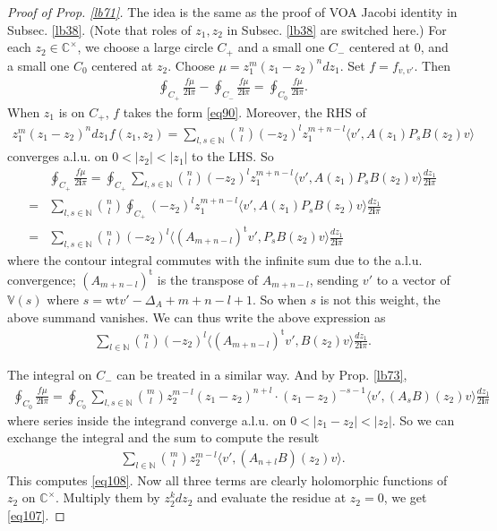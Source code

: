 \documentclass[12pt,a4paper,notitlepage]{article}
\theoremstyle{definition}
\theoremstyle{plain}
\newcommand{\tr}{\mathrm{t}} %
\newcommand{\bk}[1]{\langle {#1}\rangle}
\newcommand{\im}{\mathbf{i}}
\newcommand{\Vbb}{\mathbb V}
\newcommand{\Cbb}{\mathbb C}
\newcommand{\Nbb}{\mathbb N}
\newcommand{\wt}{\mathrm{wt}}
\numberwithin{equation}{section}
\begin{document}
\begin{proof}[Proof of Prop. \ref{lb71}]
The idea is the same as the proof of VOA Jacobi identity in Subsec. \ref{lb38}. (Note that roles of $z_1,z_2$ in Subsec. \ref{lb38} are switched here.) For each $z_2\in\Cbb^\times$, we choose a large circle $C_+$ and a small one $C_-$ centered at $0$, and a small one $C_0$ centered at $z_2$. Choose $\mu=z_1^m(z_1-z_2)^ndz_1$. Set $f=f_{v,v'}$. Then 
\begin{align}\label{eq108}
	\oint_{C_+}\frac{f\mu}{2\im\pi} -\oint_{C_-}\frac{f\mu}{2\im\pi}=\oint_{C_0} \frac{f\mu}{2\im\pi}.	
\end{align}
When $z_1$ is on $C_+$, $f$ takes the form \eqref{eq90}. Moreover, the RHS of
\begin{align*}
z_1^m(z_1-z_2)^ndz_1f(z_1,z_2)=\sum_{l,s\in\Nbb}{n\choose l}(-z_2)^lz_1^{m+n-l}\bk{v',A(z_1)P_sB(z_2)v}	
\end{align*}
converges a.l.u. on $0<|z_2|<|z_1|$ to the LHS. So
\begin{align*}
&\oint_{C_+}\frac{f\mu}{2\im\pi}=\oint_{C_+}\sum_{l,s\in\Nbb}{n\choose l}(-z_2)^lz_1^{m+n-l}\bk{v',A(z_1)P_sB(z_2)v}\frac{dz_1}{2\im\pi}\\
=&\sum_{l,s\in\Nbb}{n\choose l}\oint_{C_+}(-z_2)^lz_1^{m+n-l}\bk{v',A(z_1)P_sB(z_2)v}\frac{dz_1}{2\im\pi}\\
=&\sum_{l,s\in\Nbb}{n\choose l}(-z_2)^l\bk{(A_{m+n-l})^\tr v',P_sB(z_2)v}\frac{dz_1}{2\im\pi}
\end{align*}
where the contour integral commutes with the infinite sum due to the a.l.u. convergence; $(A_{m+n-l})^\tr$ is the transpose of $A_{m+n-l}$, sending $v'$ to a vector of $\Vbb(s)$ where $s=\wt v'-\Delta_A+m+n-l+1$. So when $s$ is not this weight, the above summand vanishes. We can thus write the above expression as
\begin{align*}
\sum_{l\in\Nbb}{n\choose l}(-z_2)^l\bk{(A_{m+n-l})^\tr v',B(z_2)v}\frac{dz_1}{2\im\pi}.
\end{align*}



The integral on $C_-$ can be treated in a similar way. And by Prop. \ref{lb73},
\begin{align*}
\oint_{C_0}\frac{f\mu}{2\im\pi}=\oint_{C_0}	\sum_{l,s\in\Nbb}{m\choose l}z_2^{m-l}(z_1-z_2)^{n+l}\cdot (z_1-z_2)^{-s-1}\bk{v',(A_sB)(z_2)v}\frac{dz_1}{2\im\pi}
\end{align*}
where series inside the integrand converge a.l.u. on $0<|z_1-z_2|<|z_2|$. So we can exchange the integral and the sum to compute the result
\begin{align*}
\sum_{l\in\Nbb}{m\choose l}z_2^{m-l}\bk{v',(A_{n+l}B)(z_2)v}.
\end{align*}
This computes \eqref{eq108}. Now all three terms are clearly holomorphic functions of $z_2$ on $\Cbb^\times$. Multiply them by $z_2^kdz_2$ and evaluate the residue at $z_2=0$, we get \eqref{eq107}.
\end{proof}
\end{document}
